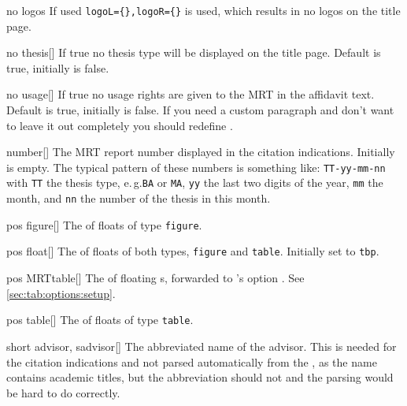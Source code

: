 \begin{describeopt}{no logos}
  If used \verb|logoL={},logoR={}| is used, which results in no logos on the
  title page.
\end{describeopt}
\begin{describeopt}{no thesis}[]
  If true no thesis type will be displayed on the title page. Default is true,
  initially is false.
\end{describeopt}
\begin{describeopt}{no usage}[]
  If true no usage rights are given to the MRT in the affidavit text. Default is
  true, initially is false. If you need a custom paragraph and don't want to
  leave it out completely you should redefine .
\end{describeopt}
\begin{describeopt}{number}[]
  The MRT report number displayed in the citation indications. Initially is
  empty. The typical pattern of these numbers is something like:
  \texttt{TT-yy-mm-nn} with \texttt{TT} the thesis type, e.\,g.\@ \texttt{BA} or
  \texttt{MA}, \texttt{yy} the last two digits of the year, \texttt{mm} the
  month, and \texttt{nn} the number of the thesis in this month.
\end{describeopt}
\begin{describeopt}{pos figure}[]
  The  of floats of type \texttt{figure}.
\end{describeopt}
\begin{describeopt}{pos float}[]
  The  of floats of both types, \texttt{figure} and
  \texttt{table}. Initially set to \texttt{tbp}.
\end{describeopt}
\begin{describeopt}{pos MRTtable}[]
  The  of floating s, forwarded to 's
  option . See \autoref{sec:tab:options:setup}.
\end{describeopt}
\begin{describeopt}{pos table}[]
  The  of floats of type \texttt{table}.
\end{describeopt}
\begin{describeopt}{short advisor, sadvisor}[]
  The abbreviated name of the advisor. This is needed for the citation
  indications and not parsed automatically from the , as the name
  contains academic titles, but the abbreviation should not and the parsing
  would be hard to do correctly.
\end{describeopt}
